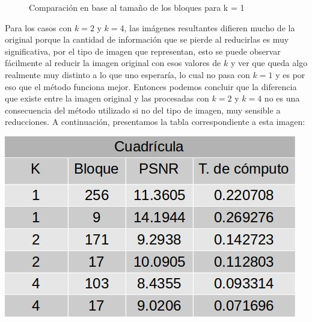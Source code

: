 \documentclass[a4paper]{article}
\begin{document}
\begin{figure}[H]
\centering
{}
\caption{Comparación en base al tamaño de los bloques para k = 1}
\end{figure}

\par Para los casos con $k = 2$ y $k = 4$, las imágenes resultantes difieren mucho de la original porque la cantidad de información que se pierde al reducirlas es muy significativa, por el tipo de imagen que representan, esto se puede observar fácilmente al reducir la imagen original con esos valores de $k$ y ver que queda algo realmente muy distinto a lo que uno esperaría, lo cual no pasa con $k = 1$ y es por eso que el método funciona mejor. Entonces podemos concluir que la diferencia que existe entre la imagen original y las procesadas con $k = 2$ y $k = 4$ no es una consecuencia del método utilizado si no del tipo de imagen, muy sensible a reducciones.
\newline A continuación, presentamos la tabla correspondiente a esta imagen:
\newline

\centerline{
\includegraphics[scale=0.5]{imagenes/cuadriculaTabla.jpg}
}
\end{document}
